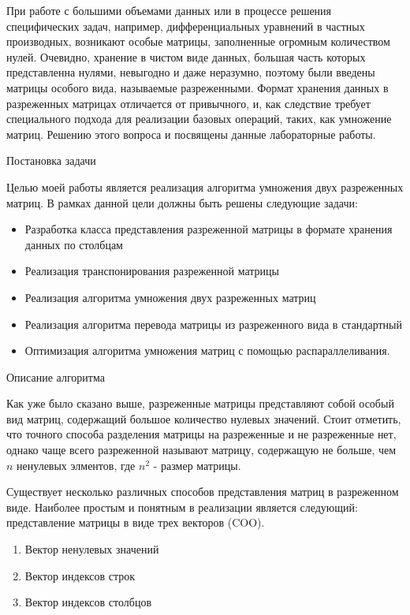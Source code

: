 \documentclass[12pt]{article}
\begin{document}
При работе с большими объемами данных или в процессе решения специфических задач, например, дифференциальных уравнений в частных производных, возникают особые матрицы, заполненные огромным количеством нулей. Очевидно, хранение в чистом виде данных, большая часть которых представленна нулями, невыгодно и даже неразумно, поэтому были введены матрицы особого вида, называемые разреженными. Формат хранения данных в разреженных матрицах отличается от привычного, и, как следствие требует специального подхода для реализации базовых операций, таких, как умножение матриц. Решению этого вопроса и посвящены данные лабораторные работы. 
\newpage
\begin{center}
\Large{Постановка задачи}
\end{center}

Целью моей работы является реализация алгоритма умножения двух разреженных матриц. В рамках данной цели должны быть решены следующие задачи:
\begin{itemize}
    \item Разработка класса представления разреженной матрицы в формате хранения данных по столбцам
    \item Реализация транспонирования разреженной матрицы
    \item Реализация алгоритма умножения двух разреженных матриц
    \item Реализация алгоритма перевода матрицы из разреженного вида в стандартный
    \item Оптимизация алгоритма умножения матриц с помощью распараллеливания.
\end{itemize}
\newpage
\begin{center}
\Large{Описание алгоритма}
\end{center}

Как уже было сказано выше, разреженные матрицы представляют собой особый вид матриц, содержащий большое количество нулевых значений. Стоит отметить, что точного способа разделения матрицы на разреженные и не разреженные нет, однако чаще всего разреженной называют матрицу, содержащую не больше, чем $n$ ненулевых элментов, где $n^2$ - размер матрицы. 

Существует несколько различных способов представления матриц в разреженном виде. Наиболее простым и понятным в реализации является следующий: представление матрицы в виде трех векторов (COO).
\begin{enumerate}
    \item Вектор ненулевых значений
    \item Вектор индексов строк
    \item Вектор индексов столбцов
\end{enumerate}
\end{document}
